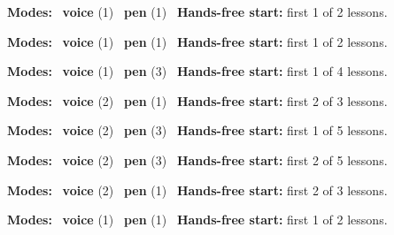 \expandafter\def\csname hlchaptermodality14\endcsname{%
  {\small\noindent
    \textbf{Modes:} \hlvoicesign{}~\textbf{voice} (1) \quad \hlpensign{}~\textbf{pen} (1)\quad
    \hlvoicesign{}~\textbf{Hands-free start:} first 1 of 2 lessons.%
    \par}\medskip
}

\expandafter\def\csname hlchaptermodality15\endcsname{%
  {\small\noindent
    \textbf{Modes:} \hlvoicesign{}~\textbf{voice} (1) \quad \hlpensign{}~\textbf{pen} (1)\quad
    \hlvoicesign{}~\textbf{Hands-free start:} first 1 of 2 lessons.%
    \par}\medskip
}

\expandafter\def\csname hlchaptermodality16\endcsname{%
  {\small\noindent
    \textbf{Modes:} \hlvoicesign{}~\textbf{voice} (1) \quad \hlpensign{}~\textbf{pen} (3)\quad
    \hlvoicesign{}~\textbf{Hands-free start:} first 1 of 4 lessons.%
    \par}\medskip
}

\expandafter\def\csname hlchaptermodality17\endcsname{%
  {\small\noindent
    \textbf{Modes:} \hlvoicesign{}~\textbf{voice} (2) \quad \hlpensign{}~\textbf{pen} (1)\quad
    \hlvoicesign{}~\textbf{Hands-free start:} first 2 of 3 lessons.%
    \par}\medskip
}

\expandafter\def\csname hlchaptermodality18\endcsname{%
  {\small\noindent
    \textbf{Modes:} \hlvoicesign{}~\textbf{voice} (2) \quad \hlpensign{}~\textbf{pen} (3)\quad
    \hlvoicesign{}~\textbf{Hands-free start:} first 1 of 5 lessons.%
    \par}\medskip
}

\expandafter\def\csname hlchaptermodality19\endcsname{%
  {\small\noindent
    \textbf{Modes:} \hlvoicesign{}~\textbf{voice} (2) \quad \hlpensign{}~\textbf{pen} (3)\quad
    \hlvoicesign{}~\textbf{Hands-free start:} first 2 of 5 lessons.%
    \par}\medskip
}

\expandafter\def\csname hlchaptermodality20\endcsname{%
  {\small\noindent
    \textbf{Modes:} \hlvoicesign{}~\textbf{voice} (2) \quad \hlpensign{}~\textbf{pen} (1)\quad
    \hlvoicesign{}~\textbf{Hands-free start:} first 2 of 3 lessons.%
    \par}\medskip
}

\expandafter\def\csname hlchaptermodality21\endcsname{%
  {\small\noindent
    \textbf{Modes:} \hlvoicesign{}~\textbf{voice} (1) \quad \hlpensign{}~\textbf{pen} (1)\quad
    \hlvoicesign{}~\textbf{Hands-free start:} first 1 of 2 lessons.%
    \par}\medskip
}

